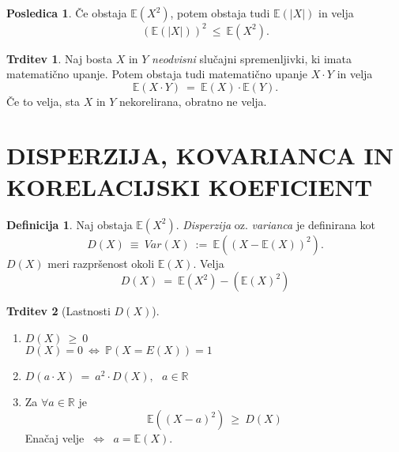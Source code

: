 \documentclass[11pt]{article}
\theoremstyle{definition}
\newtheorem{definicija}{Definicija}[section]
\theoremstyle{definition}
\newtheorem{trditev}{Trditev}[section]
\theoremstyle{definition}
\newtheorem*{posledica}{Posledica}
\begin{document}
\begin{posledica}

Če obstaja $\mathbb{E}(X^2)$, potem obstaja tudi $\mathbb{E}(|X|)$ in velja
$$(\mathbb{E}(|X|))^2 ~\leq~ \mathbb{E}(X^2).$$

\end{posledica}
\vspace{0.5cm}

\begin{trditev}

Naj bosta $X$ in $Y$ \textit{neodvisni} slučajni spremenljivki, ki imata matematično upanje. Potem obstaja tudi matematično upanje $X \cdot Y$ in velja
$$\mathbb{E}(X \cdot Y) ~=~ \mathbb{E}(X) \cdot \mathbb{E}(Y).$$
Če to velja, sta $X$ in $Y$ nekorelirana, obratno ne velja.

\end{trditev}
\vspace{0.5cm}

\pagebreak


\section{DISPERZIJA, KOVARIANCA IN KORELACIJSKI KOEFICIENT}
\vspace{0.5cm}

\begin{definicija}

Naj obstaja $\mathbb{E}(X^2)$. \textit{Disperzija} oz. \textit{varianca} je definirana kot
$$D(X) ~\equiv~ Var(X) ~:=~ \mathbb{E}((X - \mathbb{E}(X))^2).$$
$D(X)$ meri razpršenost okoli $\mathbb{E}(X)$. Velja
$$D(X) ~=~ \mathbb{E}(X^2) - (\mathbb{E}(X)^2)$$

\end{definicija}
\vspace{0.5cm}

\begin{trditev}[Lastnosti $D(X)$]
~\\
\begin{enumerate}
	\item $D(X) ~\geq~ 0$ \\
	$D(X) = 0 ~\iff~ \mathbb{P}(X = E(X)) = 1$
	\item $D(a \cdot X) ~=~ a^2 \cdot D(X), ~~~a \in \mathbb{R}$
	\item Za $\forall a \in \mathbb{R}$ je 
	$$\mathbb{E}((X - a)^2) ~\geq~ D(X)$$
	Enačaj velje $~\iff~$ $a = \mathbb{E}(X)$.
\end{enumerate}

\end{trditev}
\vspace{0.5cm}
\end{document}
